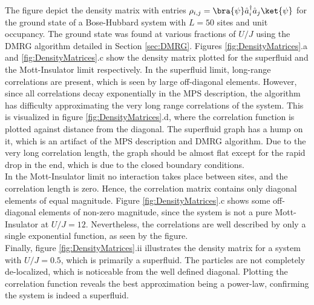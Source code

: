 The figure depict the density matrix with entries $\rho_{i,j} = \bra{\psi} \hat{a}_{i}^{\dag} \hat{a}_{j} \ket{\psi}$ for the ground state of a Bose-Hubbard system with $L = 50$ sites and unit occupancy. The ground state was found at various fractions of $U/J$ using the DMRG algorithm detailed in Section \ref{sec:DMRG}.
Figures \ref{fig:DensityMatrices}.a and \ref{fig:DensityMatrices}.c show the density matrix plotted for the superfluid and the Mott-Insulator limit respectively. In the superfluid limit, long-range correlations are present, which is seen by large off-diagonal elements. However, since all correlations decay exponentially in the MPS description, the algorithm has difficulty approximating the very long range correlations of the system. This is visualized in figure \ref{fig:DensityMatrices}.d, where the correlation function is plotted against distance from the diagonal. The superfluid graph has a hump on it, which is an artifact of the MPS description and DMRG algorithm. Due to the very long correlation length, the graph should be almost flat except for the rapid drop in the end, which is due to the closed boundary conditions.\\
In the Mott-Insulator limit no interaction takes place between sites, and the correlation length is zero. Hence, the correlation matrix contains only diagonal elements of equal magnitude. Figure \ref{fig:DensityMatrices}.c shows some off-diagonal elements of non-zero magnitude, since the system is not a pure Mott-Insulator at $U/J = 12$. Nevertheless, the correlations are well described by only a single exponential function, as seen by the figure.\\
Finally, figure \ref{fig:DensityMatrices}.ii illustrates the density matrix for a system with $U/J = 0.5$, which is primarily a superfluid. The particles are not completely de-localized, which is noticeable from the well defined diagonal. Plotting the correlation function reveals the best approximation being a power-law, confirming the system is indeed a superfluid. 
